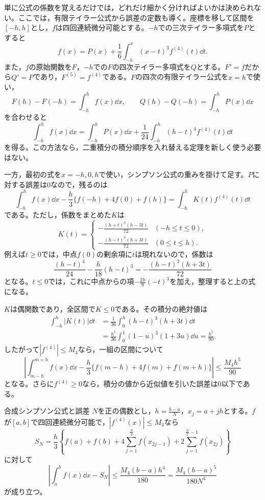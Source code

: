 単に公式の係数を覚えるだけでは，どれだけ細かく分ければよいかは決められない。ここでは，有限テイラー公式から誤差の定数も導く。座標を移して区間を$[-h,h]$とし，$f$は四回連続微分可能とする。$-h$での三次テイラー多項式を$P$とすると
\[
 f(x)=P(x)+\frac16\int_{-h}^x(x-t)^3f^{(4)}(t)\dd t.
\]
また，$f$の原始関数を$F$，$-h$での$F$の四次テイラー多項式を$Q$とする。$F'=f$だから$Q'=P$であり，$F^{(5)}=f^{(4)}$である。$F$の四次の有限テイラー公式を$x=h$で使い，
\[
 F(h)-F(-h)=\int_{-h}^h f(x)\dd x,\qquad
 Q(h)-Q(-h)=\int_{-h}^h P(x)\dd x
\]
を合わせると
\[
 \int_{-h}^hf(x)\dd x
 =\int_{-h}^hP(x)\dd x
  +\frac1{24}\int_{-h}^h(h-t)^4f^{(4)}(t)\dd t
\]
を得る。この方法なら，二重積分の積分順序を入れ替える定理を新しく使う必要はない。

一方，最初の式を$x=-h,0,h$で使い，シンプソン公式の重みを掛けて足す。$P$に対する誤差は$0$なので，残るのは
\[
 \int_{-h}^hf(x)\dd x
 -\frac h3\{f(-h)+4f(0)+f(h)\}
 =\int_{-h}^hK(t)f^{(4)}(t)\dd t
\]
である。ただし，係数をまとめた$K$は
\[
 K(t)=
 \begin{cases}
 -\frac{(h+t)^3(h-3t)}{72}&(-h\leq t\leq0),\\[4pt]
 -\frac{(h-t)^3(h+3t)}{72}&(0\leq t\leq h).
 \end{cases}
\]
例えば$t\geq0$では，中点$f(0)$の剰余項に$t$は現れないので，係数は
\[
 \frac{(h-t)^4}{24}-\frac h{18}(h-t)^3
 =-\frac{(h-t)^3(h+3t)}{72}
\]
となる。$t\leq0$では，これに中点からの項$-\frac{2h}{9}(-t)^3$を加え，整理すると上の式になる。

$K$は偶関数であり，全区間で$K\leq0$である。その積分の絶対値は
\[
\begin{aligned}
 \int_{-h}^h|K(t)|\dd t
 &=\frac1{36}\int_0^h(h-t)^3(h+3t)\dd t\\
 &=\frac{h^5}{36}\int_0^1(1-u)^3(1+3u)\dd u
 =\frac{h^5}{90}.
\end{aligned}
\]
したがって$|f^{(4)}|\leq M_4$なら，一組の区間について
\[
 \left|\int_{m-h}^{m+h}f(x)\dd x
 -\frac h3\{f(m-h)+4f(m)+f(m+h)\}\right|
 \leq\frac{M_4h^5}{90}
\]
となる。さらに$f^{(4)}\geq0$なら，積分の値から近似値を引いた誤差は$0$以下である。

\begin{theorem}{合成シンプソン公式と誤差}
$N$を正の偶数とし，$h=\frac{b-a}{N}$，$x_j=a+jh$とする。$f$が$[a,b]$で四回連続微分可能で，$|f^{(4)}(x)|\leq M_4$なら
\[
 S_N=\frac h3\left\{f(a)+f(b)
 +4\sum_{j=1}^{\frac N2}f(x_{2j-1})
 +2\sum_{j=1}^{\frac N2-1}f(x_{2j})\right\}
\]
に対して
\[
 \left|\int_a^bf(x)\dd x-S_N\right|
 \leq\frac{M_4(b-a)h^4}{180}
 =\frac{M_4(b-a)^5}{180N^4}
\]
が成り立つ。
\end{theorem}

